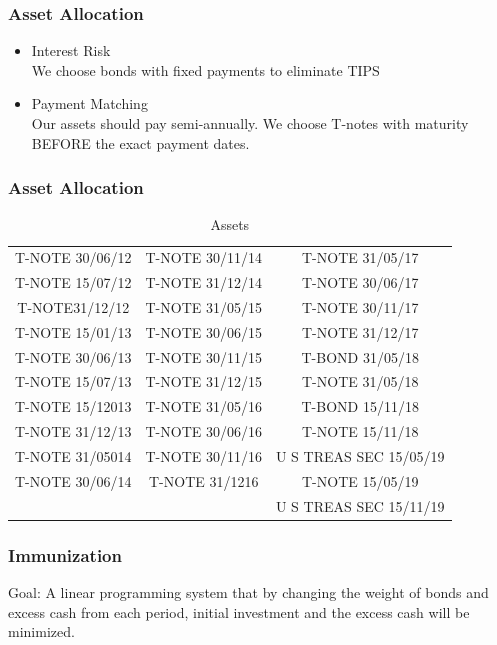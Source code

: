 \documentclass[compress,handout,10pt]{beamer}
\let\olditem\item
\renewcommand{\item}{\setlength{\itemsep}{0.5\baselineskip}\olditem}
\begin{document}
\begin{frame}
    \frametitle{Asset Allocation}
\begin{itemize}
\item Interest Risk \\
We choose bonds with fixed payments to eliminate TIPS
\vspace{8mm}
\item Payment Matching\\
Our assets should pay semi-annually. We choose T-notes with maturity BEFORE the exact payment dates. 
\end{itemize}
\end{frame}

\begin{frame}
    \frametitle{Asset Allocation}
\begin{table}[h]
\centering  
\begin{tabular}[width=4cm,height=2.3cm]{ccc}
\hline
T-NOTE 30/06/12  &T-NOTE 30/11/14       &T-NOTE  31/05/17\\
T-NOTE 15/07/12   &T-NOTE 31/12/14        &T-NOTE 30/06/17\\
T-NOTE31/12/12   &T-NOTE  31/05/15   &T-NOTE 30/11/17\\
T-NOTE 15/01/13    &T-NOTE 30/06/15  & T-NOTE 31/12/17\\
T-NOTE 30/06/13  & T-NOTE 30/11/15   &T-BOND  31/05/18\\
T-NOTE 15/07/13    &T-NOTE 31/12/15   &T-NOTE  31/05/18\\
T-NOTE 15/12013   &T-NOTE 31/05/16   &T-BOND 15/11/18\\
T-NOTE 31/12/13  & T-NOTE 30/06/16   &T-NOTE 15/11/18\\
T-NOTE 31/05014   &T-NOTE 30/11/16   &U S TREAS SEC 15/05/19\\
T-NOTE 30/06/14   &T-NOTE 31/1216  &T-NOTE 15/05/19\\
                                                &&U S TREAS SEC 15/11/19\\\hline
\end{tabular}
\caption{Assets}
\end{table}
\end{frame}

\begin{frame}
\frametitle{Immunization}
Goal: A linear programming system  that by changing the weight of  bonds  and excess cash from each period,  initial investment and the excess cash will be minimized.\\
\end{frame}
\end{document}
